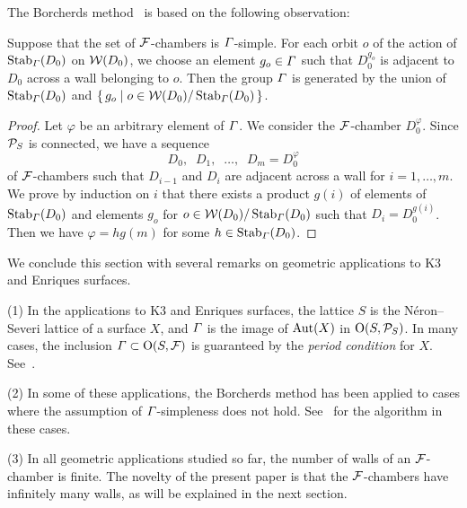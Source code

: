\documentclass{amsart} %
\begin{document}
\par
The Borcherds method~\cite{MR913200, MR1654763} is 
based on the following observation:
%
\begin{proposition}\label{prop:observation}
Suppose that the set of $\mathord{\mathcal{F}}$-chambers is $\varGamma$-simple.
For each orbit $o$ of the action of $\operatorname{Stab}_{\varGamma}(D_0)$ on $\mathord{\mathcal{W}}(D_0)$,
we choose an element $g_o\in \varGamma$ such that
$D_0^{g_o}$ is adjacent to $D_0$ across a wall
belonging to $o$.
Then the group $\varGamma$ is generated by the union of 
$\operatorname{Stab}_{\varGamma}(D_0)$ and $\{\,{g_o}\mid {o\in \mathord{\mathcal{W}}(D_0)/\operatorname{Stab}_{\varGamma}(D_0)} \,\}$.
\end{proposition}
%
\begin{proof}
Let $\varphi$ be an arbitrary element of $\varGamma$.
We consider the $\mathord{\mathcal{F}}$-chamber $D_0^{\varphi}$.
Since $\mathord{\mathcal{P}}_S$ is connected, 
we have a sequence
\[
D_0, \;\; D_1, \;\; \dots, \;\; D_m=D_0^{\varphi}
\]
of $\mathord{\mathcal{F}}$-chambers such that $D_{i-1}$ and $D_i$ are 
adjacent across a wall for $i=1, \dots, m$.
We prove by induction on $i$ that there exists 
a product $g(i)$ of elements of $\operatorname{Stab}_{\varGamma}(D_0)$ and 
 elements $g_o$ for $o\in \mathord{\mathcal{W}}(D_0)/\operatorname{Stab}_{\varGamma}(D_0)$
such that $D_i=D_0^{g(i)}$.
Then we have $\varphi=h g(m) $ for some $h\in \operatorname{Stab}_{\varGamma}(D_0)$.
\end{proof}
%
We conclude this section with several remarks on geometric applications
to K3 and Enriques surfaces. 
%
\begin{remark}\label{rem:geom}
(1) 
In the applications to K3 and Enriques surfaces, 
the lattice $S$ is the N\'eron--Severi lattice of a surface $X$,
and $\varGamma$ is the image of $\operatorname{Aut}(X)$ in $\mathord{\mathrm{O}}(S,\mathord{\mathcal{P}}_S)$.
In many cases, the inclusion
$\varGamma \subset \mathord{\mathrm{O}}(S,\mathord{\mathcal{F}})$
is guaranteed by the \emph{period condition} for $X$.
See~\cite[Section~5.2]{MR4759604}.
\par
(2) 
In some of these applications, 
the Borcherds method has been applied to cases where 
the assumption of $\varGamma$-simpleness does not hold.
See~\cite[Section 5.1]{MR4759604} for the algorithm
in these cases.
%
\par
(3) 
In all geometric applications studied so far,
the number of walls of an $\mathord{\mathcal{F}}$-chamber is finite.
The novelty of the present paper is that
the $\mathord{\mathcal{F}}$-chambers have infinitely many walls,
as will be explained in the next section.
\end{remark}
%
%
\end{document}
